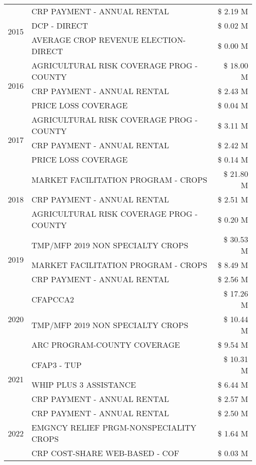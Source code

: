 \begin{tabular}{llr}
\multirow[t]{3}{*}{2015} & CRP PAYMENT - ANNUAL RENTAL & \$ 2.19 M \\
 & DCP - DIRECT & \$ 0.02 M \\
 & AVERAGE CROP REVENUE ELECTION-DIRECT & \$ 0.00 M \\
\cline{1-3}
\multirow[t]{3}{*}{2016} & AGRICULTURAL RISK COVERAGE PROG - COUNTY & \$ 18.00 M \\
 & CRP PAYMENT - ANNUAL RENTAL & \$ 2.43 M \\
 & PRICE LOSS COVERAGE & \$ 0.04 M \\
\cline{1-3}
\multirow[t]{3}{*}{2017} & AGRICULTURAL RISK COVERAGE PROG - COUNTY & \$ 3.11 M \\
 & CRP PAYMENT - ANNUAL RENTAL & \$ 2.42 M \\
 & PRICE LOSS COVERAGE & \$ 0.14 M \\
\cline{1-3}
\multirow[t]{3}{*}{2018} & MARKET FACILITATION PROGRAM - CROPS & \$ 21.80 M \\
 & CRP PAYMENT - ANNUAL RENTAL & \$ 2.51 M \\
 & AGRICULTURAL RISK COVERAGE PROG - COUNTY & \$ 0.20 M \\
\cline{1-3}
\multirow[t]{3}{*}{2019} & TMP/MFP 2019 NON SPECIALTY CROPS & \$ 30.53 M \\
 & MARKET FACILITATION PROGRAM - CROPS & \$ 8.49 M \\
 & CRP PAYMENT - ANNUAL RENTAL & \$ 2.56 M \\
\cline{1-3}
\multirow[t]{3}{*}{2020} & CFAPCCA2 & \$ 17.26 M \\
 & TMP/MFP 2019 NON SPECIALTY CROPS & \$ 10.44 M \\
 & ARC PROGRAM-COUNTY COVERAGE & \$ 9.54 M \\
\cline{1-3}
\multirow[t]{3}{*}{2021} & CFAP3 - TUP & \$ 10.31 M \\
 & WHIP PLUS 3 ASSISTANCE & \$ 6.44 M \\
 & CRP PAYMENT - ANNUAL RENTAL & \$ 2.57 M \\
\cline{1-3}
\multirow[t]{3}{*}{2022} & CRP PAYMENT - ANNUAL RENTAL & \$ 2.50 M \\
 & EMGNCY RELIEF PRGM-NONSPECIALITY CROPS & \$ 1.64 M \\
 & CRP COST-SHARE WEB-BASED - COF & \$ 0.03 M \\
\cline{1-3}
\bottomrule
\end{tabular}
